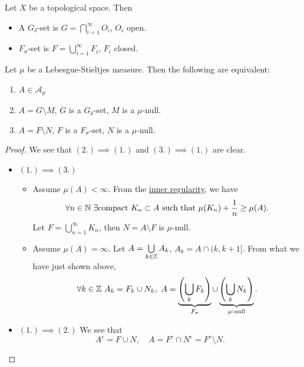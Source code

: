 \begin{definition}
	Let \(X\) be a topological space. Then
	\begin{itemize}
		\item A \(G_{\delta }\)-set is \(G = \bigcap\limits_{i=1}^{\infty} O_{i}\), \(O_{i}\) open.
		\item \(F_{\sigma}\)-set is \(F = \bigcup\limits_{i=1}^{\infty} F_{i}\), \(F_{i}\) closed.
	\end{itemize}
\end{definition}

\begin{theorem}
	Let \(\mu \) be a Lebesgue-Stieltjes measure. Then the following are equivalent:
	\begin{enumerate}
		\item \(A\in \mathcal{A} _\mu \)
		\item \(A = G\setminus M\), \(G\) is a \(G_{\delta }\)-set, \(M\) is a \(\mu\)-null.
		\item \(A = F\setminus N\), \(F\) is a \(F_{\sigma}\)-set, \(N\) is a \(\mu\)-null.
	\end{enumerate}
\end{theorem}
\begin{proof}
	We see that \((2.) \implies (1.)\) and \((3.)\implies (1.)\) are clear.
	\begin{itemize}
		\item \((1.)\implies (3.)\)
		      \begin{itemize}
			      \item Assume \(\mu (A)<\infty \). From the \hyperref[thm:inner-regularity]{inner regularity}, we have
			            \[
				            \forall n\in\mathbb{\MakeUppercase{n}} \ \exists \text{compact }K_{n}\subset A\text{ such that } \mu (K_{n}) + \frac{1}{n} \geq \mu (A).
			            \]
			            Let \(F = \bigcup\limits_{n=1}^{\infty} K_{n}\), then \(N = A\setminus F\) is \(\mu\)-null.
			      \item Assume \(\mu (A) = \infty \). Let \(A = \bigcup\limits_{k\in\mathbb{\MakeUppercase{z}} } A_{k}\), \(A_{k} = A\cap (k, k+1]\). From what we
			            have just shown above,
			            \[
				            \forall k\in\mathbb{\MakeUppercase{z}}\ A_{k} = F_{k}\cup N_{k},\ A = \underbrace{\left(\bigcup\limits_{k}F_{k} \right)}_{F_{\sigma }}\cup \underbrace{\left(\bigcup\limits_{k}N_{k}\right)}_{\mu\text{-null}}.
			            \]
		      \end{itemize}
		\item \((1.)\implies (2.)\) We see that
		      \[
			      A^{c} = F\cup N,\quad A = F^{c} \cap N^{c} = F^{c} \setminus N.
		      \]
	\end{itemize}
\end{proof}


